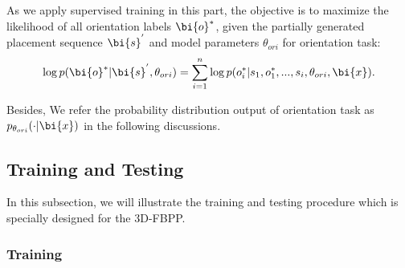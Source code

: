 As we apply supervised training in this part, the objective is to maximize the likelihood of all orientation labels $\bi{o}^{*}$, given the partially generated placement sequence $\bi{s}^{'}$ and model parameters $\theta_{ori}$ for orientation task:
\begin{eqnarray*}
	\log{p(\bi{o}^{*}|\bi{s}^{'}, \theta_{ori})} = \sum_{i=1}^{n}\log{p(o_{i}^{*}|s_{1}, o_{1}^{*},..., s_{i}, \theta_{ori}, \bi{x})}.
\end{eqnarray*}

Besides, We refer the probability distribution output of orientation task as $p_{\theta_{ori}}(\cdot|\bi{x})$ in the following discussions.

\subsection{Training and Testing}
\label{sec:training_Testing}
In this subsection, we will illustrate the training and testing procedure which is specially designed for the 3D-FBPP.
\subsubsection{Training}
\label{sec:train}

